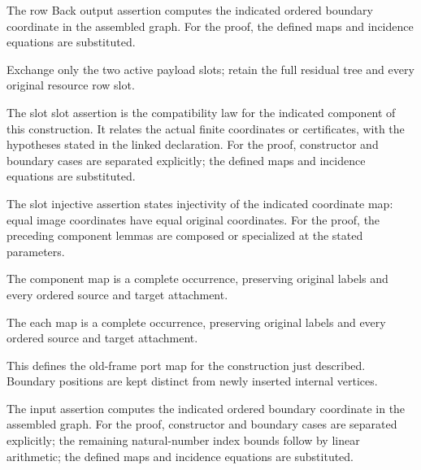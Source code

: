 The row Back output assertion computes the indicated ordered boundary coordinate in the assembled graph.
For the proof, the defined maps and incidence equations are substituted.
\par{}

Exchange only the two active payload slots; retain the full residual tree and every original resource row slot.
\par{}

The slot slot assertion is the compatibility law for the indicated component of this construction. It relates the actual finite coordinates or certificates, with the hypotheses stated in the linked declaration.
For the proof, constructor and boundary cases are separated explicitly; the defined maps and incidence equations are substituted.
\par{}

The slot injective assertion states injectivity of the indicated coordinate map: equal image coordinates have equal original coordinates.
For the proof, the preceding component lemmas are composed or specialized at the stated parameters.
\par{}

The component map is a complete occurrence, preserving original labels and every ordered source and target attachment.
\par{}

The each map is a complete occurrence, preserving original labels and every ordered source and target attachment.
\par{}

This defines the old-frame port map for the construction just described. Boundary positions are kept distinct from newly inserted internal vertices.
\par{}

The input assertion computes the indicated ordered boundary coordinate in the assembled graph.
For the proof, constructor and boundary cases are separated explicitly; the remaining natural-number index bounds follow by linear arithmetic; the defined maps and incidence equations are substituted.
\par{}

